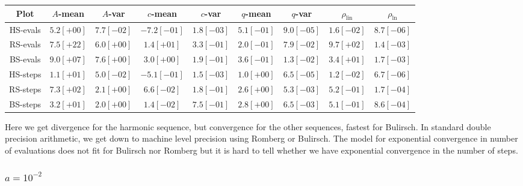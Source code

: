 \begin{table}[H]
    \centering
        \small
    \begin{tabular}{c||c|c|c|c|c|c|c|c}
Plot & \(A\)-mean & \(A\)-var & \(c\)-mean & \(c\)-var & \(q\)-mean & \(q\)-var & \(\rho_{\operatorname{lin}}\) & \(\rho_{\ln}\)\\\hline
\rowcolor{red}
HS-evals & \(5.2[+00]\) & \(7.7[-02]\) & \(-7.2[-01]\) & \(1.8[-03]\) & \(5.1[-01]\) & \(9.0[-05]\) & \(1.6[-02]\) & \(8.7[-06]\) \\
\rowcolor{red}
RS-evals & \(7.5[+22]\) & \(6.0[+00]\) & \(1.4[+01]\) & \(3.3[-01]\) & \(2.0[-01]\) & \(7.9[-02]\) & \(9.7[+02]\) & \(1.4[-03]\) \\
\rowcolor{red}
BS-evals & \(9.0[+07]\) & \(7.6[+00]\) & \(3.0[+00]\) & \(1.9[-01]\) & \(3.6[-01]\) & \(1.3[-02]\) & \(3.4[+01]\) & \(1.7[-03]\) \\
\rowcolor{red}
HS-steps & \(1.1[+01]\) & \(5.0[-02]\) & \(-5.1[-01]\) & \(1.5[-03]\) & \(1.0[+00]\) & \(6.5[-05]\) & \(1.2[-02]\) & \(6.7[-06]\) \\
\rowcolor{yellow}
RS-steps & \(7.3[+02]\) & \(2.1[+00]\) & \(6.6[-02]\) & \(1.8[-01]\) & \(2.6[+00]\) & \(5.3[-03]\) & \(5.2[-01]\) & \(1.7[-04]\) \\
\rowcolor{yellow}
BS-steps & \(3.2[+01]\) & \(2.0[+00]\) & \(1.4[-02]\) & \(7.5[-01]\) & \(2.8[+00]\) & \(6.5[-03]\) & \(5.1[-01]\) & \(8.6[-04]\) \\
    \end{tabular}
    \label{tab:my_label}
\end{table}

Here we get divergence for the harmonic sequence, but convergence for the other sequences, fastest for Bulirsch. In standard double precision arithmetic, we get down to machine level precision using Romberg or Bulirsch. The model for exponential convergence in number of evaluations does not fit for Bulirsch nor Romberg but it is hard to tell whether we have exponential convergence in the number of steps.

\subsubsection{\(a = 10^{-2}\)}

